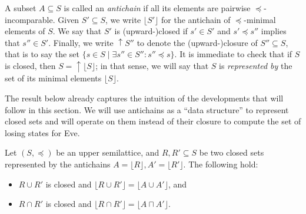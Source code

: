 \documentclass[runningheads,a4paper,draft]{llncs}
\newcommand{\eve}{Eve\xspace}
\newcommand{\closeup}[1]{\mathrm{\uparrow} #1}
\begin{document}
A subset $A \subseteq S$ is called an \emph{antichain} if all its elements are
pairwise $\preceq$-incomparable.  Given $S' \subseteq S$, we write $\lfloor S'
\rfloor$ for the antichain of $\preceq$-minimal elements of $S$. We say that
$S'$ is (upward-)closed if $s' \in S'$ and $s' \preceq s''$ implies that $s''
\in S'$. Finally, we write $\closeup{S''}$ to denote the (upward-)closure of
$S'' \subseteq S$, that is to say the set $\{s \in S \mid \exists s'' \in S''
: s'' \preceq s\}$.  It is immediate to check that if \(S\) is closed, then
\(S = \closeup{\lfloor S \rfloor}\); in that sense, we will say that \(S\) is \emph{represented
  by} the set of its minimal elements \(\lfloor S \rfloor\).

The result below already captures the intuition of the developments that
will follow in this section. We will use antichains as a ``data structure'' to
represent closed sets and will operate on them instead of their closure to
compute the set of losing states for \eve.
\begin{proposition}\label{pro:antichains}
  Let $(S, \preceq)$ be an upper semilattice, and $R,R' \subseteq S$ be two
  closed sets represented by the antichains $A = \lfloor R \rfloor, A' =
  \lfloor R' \rfloor$. The following hold:
  \begin{itemize}
    \item $R \cup R'$ is closed and $\lfloor R \cup R' \rfloor = \lfloor A
      \cup A'\rfloor$, and
    \item $R \cap R'$ is closed and $\lfloor R \cap R' \rfloor = \lfloor A
      \sqcap A'\rfloor$.
  \end{itemize}
\end{proposition}
\end{document}
